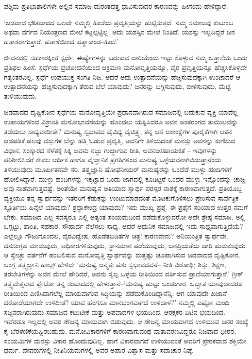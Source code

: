 ಪಶ್ಚಿಮ ಪ್ರತಿಭಾಶಾಲಿಗಳೇ ಅಲ್ಲಿನ ಸಮಾಜ ದುರಂತದತ್ತ ಧಾವಿಸುವುದರ ಕಾರಣವನ್ನು ಹೀಗೆಂದು ಹೇಳಿದ್ದಾರೆ:

‘ಜಡವಾದ ಭೌತವಾದದ ಒಲವೇ ನಮ್ಮಲ್ಲಿ ಹಿಂಸೆಯ ಪ್ರವೃತ್ತಿಯನ್ನು ಹುಟ್ಟಿಸುತ್ತದೆ. ನಮ್ಮ ಸಮಾಜವು ಕುಟುಂಬ ಅಥವಾ ವರ್ಗದ ನಿಯಂತ್ರಣದ ಮೇಲೆ ಕಟ್ಟಲ್ಪಟ್ಟಿಲ್ಲ. ಅದು ಯಶಸ್ಸಿನ ಮೇಲೆ ನಿಂತಿದೆ. ಯಶಸ್ಸು ಇಲ್ಲದಿದ್ದರೆ ಜನ ಹತಾಶರಾಗುತ್ತಾರೆ. ಹತಾಶೆಯಿಂದ ಹತ್ಯಾಕಾಂಡ–ಹಿಂಸೆ.’

ಜೀವನದಲ್ಲಿ ಸಹಕಾರಕ್ಕಿಂತ ಸ್ಪರ್ಧೆ, ಈರ್ಷ್ಯೆಗಳನ್ನು ಬದುಕುವ ದಾರಿಯೆಂದು ಇಟ್ಟು ಕೊಳ್ಳುವ ನಮ್ಮ ಒತ್ತಾಸೆಯ ಒಂದು ಪ್ರತಿಫಲ ಹಿಂಸೆ. ಸ್ಪರ್ಧೆಯ ಪ್ರಚೋದನೆಯಿಂದ ಆಕ್ರಮಣ ಮನೋವೃತ್ತಿಯನ್ನೂ, ವೈರ ಪ್ರವೃತ್ತಿಯನ್ನೂ ಹೆಚ್ಚಿಸಿಕೊಳ್ಳದೇ ಗತ್ಯಂತರವಿಲ್ಲ. ಸ್ಪರ್ಧೆ ಉಪಯುಕ್ತ ಸಂಗತಿ ನಿಜ. ಆದರೆ ಅದು ಉತ್ಪಾದನೆಯನ್ನು ಹೆಚ್ಚಿಸುವುದಕ್ಕಾಗಿ ಉಂಟಾದರೆ ಆ ಉತ್ಪಾದನೆಯನ್ನು ಹೆಚ್ಚಿಸುವುದಕ್ಕಾಗಿ ತೆರುವ ಬೆಲೆ ಯಾವುದು? ಜನರನ್ನು ಬಗ್ಗಿಸುವುದು, ಬೀಳಿಸುವುದು, ಮೆಟ್ಟಿ ತುಳಿಯುವುದು.

ಜಡವಾದದ ದೃಷ್ಟಿಕೋನ ಸ್ಪರ್ಧೆಯ ಮನೋವೃತ್ತಿಯೇ ಪ್ರಧಾನವಾಗಿರುವ ಸಮಾಜದಲ್ಲಿ ಬದುಕುವ ವ್ಯಕ್ತಿ ಯಾವೆಲ್ಲ ಉಪಾಯಗಳಿಂದ ವಿಶ್ರಾಂತಿ ಮನೋಭಾವನೆಯನ್ನು ಹೊಂದಲು ಯತ್ನಿಸಿದರೂ ಅವನ ಅಂತರಂಗದ ತುಮುಲವನ್ನು ತಡೆಯಲು ಸಾಧ್ಯವಾದೀತೇ? ಮನುಷ್ಯ ಸ್ವಭಾವದ ವೈವಿಧ್ಯ ವೈಚಿತ್ರ್ಯ, ತನ್ನ ಆಸೆ ಆಕಾಂಕ್ಷೆಗಳ ಪೂರೈಕೆಗಾಗಿ ಆತನ ಚಡಪಡಿಕೆ,\break ಹಲವು ವಸ್ತುಗಳ ಬೆನ್ನು ಹತ್ತಿ ಓಡುವ ಪ್ರವೃತ್ತಿ, ಅವನಿಗೇ ತಿಳಿಯದಂತೆ ಮನಸ್ಸು ಅವನನ್ನು ಕುಣಿಸುವ ವಿಧಾನ, ಸಂಸ್ಕಾರದ ಸೆಳೆತಕ್ಕೆ ಸಿಕ್ಕಿ ಅವನು ನಜ್ಜು ಗುಜ್ಜಾಗುವ ರೀತಿ, ಅವನ\break ಅಸಹಾಯಕತೆ – ಇವುಗಳನ್ನು ಪರಿಶೀಲಿಸಿದರೆ ಕೇವಲ ಆರ್ಥಿಕ ಹಾಗೂ ವೈಜ್ಞಾನಿಕ ಪ್ರಗತಿಗಳಿಂದ ಮನುಷ್ಯ ಒಳ್ಳೆಯವನಾಗಿಬಿಡುತ್ತಾನೆಂದು ತಿಳಿಯುವುದು ಮೂರ್ಖತನವೇ ಸರಿ. ತತ್ತ್ವಜ್ಞಾನಿ ಷೋಫನೀಯರ್ ಮನುಷ್ಯರನ್ನು ಒಂದೆಡೆ ಮುಳ್ಳು ಹಂದಿಗಳಿಗೆ ಹೋಲಿಸಿದ್ದಾರೆ. ಮುಳ್ಳು ಹಂದಿಗಳನ್ನು ಇಕ್ಕಟ್ಟಾದ ಒಂದು ಜಾಗದಲ್ಲಿ ಕೂಡಿಟ್ಟರೆ ಒಂದರ ಮುಳ್ಳು ಇನ್ನೊಂದನ್ನು ಚುಚ್ಚಿ ಅವು ನಾಶವಾಗುತ್ತವಷ್ಟೆ. ಅಂತೆಯೇ ಮನುಷ್ಯನ ಅತಿಯಾದ ಸ್ವಾರ್ಥ ಪರಸ್ಪರ ನಾಶಕ್ಕೆ ಕಾರಣವಾಗುತ್ತದೆ. ಪ್ರತಿಯೊಬ್ಬ ವ್ಯಕ್ತಿಯೂ ತನ್ನ ಸ್ವಾರ್ಥವನ್ನು ಇತರರಿಗೆ ಕೆಡುಕನ್ನು ಉಂಟುಮಾಡದಂತೆ ಮೊಟಕುಗೊಳಿಸಲು ಪ್ರೇರಿಸುವ ಸಾರ್ವತ್ರಿಕ ಸ್ಫೂರ್ತಿಯ ಹಿನ್ನೆಲೆ ಯಾವುದು? ಶ್ರದ್ಧಾಕೇಂದ್ರ ಯಾವುದು? ಇದು ಮುಖ್ಯ ಪ್ರಶ್ನೆ. ಈ ಪ್ರಶ್ನೆಗೆ ಸರಿಯಾದ ಉತ್ತರ ನಮಗೆ ಬೇಕು. ಸಮಾಜದ ಎಲ್ಲ ಸದಸ್ಯರೂ ಎಲ್ಲಿ ಅತ್ಯಂತ ಸಂಯಮದಿಂದ ನಡೆದುಕೊಳ್ಳುವರೋ ಅದೇ ಶ್ರೇಷ್ಠ ಸಮಾಜ. ಅಲ್ಲಿ ಒಗ್ಗಟ್ಟು, ಶಾಂತಿ, ಸಹಕಾರ, ಸೌಹಾರ್ದ ನೆಲೆಸಲು ಸಾಧ್ಯ. ಆದರೆ ಆಧುನಿಕ ಸಮಾಜದಲ್ಲಿ ಇದು ಸಾಧ್ಯವಾಗುತ್ತಿದೆಯೆ? ಎಲ್ಲೆಲ್ಲೂ ಗೌಜುಗೊಂದಲ, ವೈರವಿದ್ವೇಷ, ಹೊಡೆತಬಡಿತಗಳ ಚಿತ್ರ! ಕಾರಣವೇನು? ಅನಿಯಂತ್ರಿತ ಸ್ವಾರ್ಥವೇ. ಧನಸಂಗ್ರಹ ಮಾಡುವುದು, ಅಧಿಕಾರಗಳಿಸುವುದು, ಸ್ಥಾನಮಾನ ಪಡೆಯುವುದು, ಜನಪ್ರಿಯತೆಯ ದಾರಿ ಹುಡುಕುವುದು. ಆ ಸ್ವೇಚ್ಛಾ ವರ್ತನೆಗೆ ಹಂಬಲಿಸುವ ಮನೋವೃತ್ತಿ ಸ್ವಾರ್ಥವನ್ನು ಮತ್ತಷ್ಟು ಚೂಪಾಗಿಸುವ ಜಡವಾದದ ದೃಷ್ಟಿಕೋನ. ಆಂಗ್ಲ ತತ್ತ್ವಜ್ಞಾನಿ ಹಾಬ್ಸ್ ಹೇಳಿದ: ‘ಮನುಷ್ಯ ಜನ್ಮತಃ ಪಶು ಸ್ವಭಾವದವನೆ– ನೀತಿ ವಿರೋಧಿ; ಶಿಸ್ತು, ಶಿಕ್ಷಣ, ತರಬೇತಿಗಳನ್ನು ಅವನ ಮೇಲೆ ಹೇರಿದರೆ, ಅವನು ಸ್ವಲ್ಪ ಒಳ್ಳೆಯ ರೀತಿಯಿಂದ ವರ್ತಿಸುವ ಪ್ರಾಣಿಯಾಗುತ್ತಾನೆ.’ ಗ್ರೀಕ್ ತತ್ತ್ವವೇತ್ತನಾದ ಪ್ಲೇಟೋ ತನ್ನ ಸಂವಾದದಲ್ಲಿ ಹೇಳುತ್ತಾನೆ–‘ಮನುಷ್ಯ ಹುಟ್ಟು ಬಂಡುಗಾರ. ಒಬ್ಬಾತ ಯಾವುದಾದರೂ ರೀತಿಯಿಂದ ಎಣಿಸಿದಾಗಲೆಲ್ಲ ಮಾಯವಾಗುವ ಸಿದ್ಧಿಯನ್ನು ಪಡೆದುಕೊಂಡಿದ್ದಾನೆನ್ನಿ. ಆಗ ಯಾವುದೇ ಖಜಾನೆ ದರೋಡೆಯಾಗದೇ ಉಳಿದೀತೆ? ಯಾವ ಹೆಂಗಸೂ ಮಾನಭಂಗವಾಗದೆ ಉಳಿದಾಳೆ?’ ನಮ್ಮಲ್ಲಿ ಎಷ್ಟೋ ಮಂದಿ ಸಜ್ಜನರಾಗಿರುವುದು ಸಮಾಜದ ಕಟುಟೀಕೆ ಮತ್ತು ಅಪವಾದಗಳ ಭಯದಿಂದ, ಆರಕ್ಷಕರ ಏಟಿನ ಭಯದಿಂದ. ಇವೆರಡೂ ಇಲ್ಲದಲ್ಲಿ ಅವರ ಸೌಜನ್ಯ ಮಾಯವಾಗಿ ಬಿಡುವುದು. ಆ ಸೌಜನ್ಯ ಮಾಯವಾಗದೆ ಉಳಿಯುವ ಜನರ ಸಂಖ್ಯೆ ಕೈ ಬೆರಳೆಣಿಕೆಯಷ್ಟಿರಬಹುದು. ಮನೋವಿಕಾರಗಳಿಗೆ ಕಾರಣವಾಗುವಂಥ ವಾತಾವರಣವಿದ್ದರೂ ನಿಜವಾದ ಧೀರರ, ಸಂಯಮಿಗಳ ಮನಸ್ಸು ವಿಕಾರ ಹೊಂದುವುದಿಲ್ಲ. ಹಾಗೆ ವಿಕಾರವಾಗದೆ ಉಳಿಯುವಂತೆ ಅವರಿಗೆ ಪ್ರೇರಕವಾದ ಶಕ್ತಿಯೇ ಧರ್ಮ. ದೇವರುಗಳಲ್ಲಿ ನೀತಿನಿಯಮಗಳಲ್ಲಿ ಅವರ ಅಪಾರ ವಿಶ್ವಾಸ ಮತ್ತು ಸದಾಚಾರ ನಿಷ್ಠೆ.



